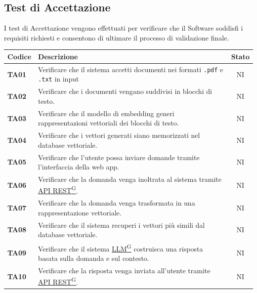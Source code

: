\documentclass{article}
\begin{document}
\newpage
\subsection{Test di Accettazione} %
I test di Accettazione vengono effettuati per verificare che il Software soddisfi i requisiti richiesti e consentono di ultimare il processo di validazione finale.

\begin{longtable}{|>{\centering\arraybackslash}m{}|>{\raggedright\arraybackslash}m{}|c|}
    \hline
    \textbf{Codice} & \textbf{Descrizione} & \textbf{Stato} \\
    \hline
    \textbf{TA01} & Verificare che il sistema accetti documenti nei formati \texttt{.pdf} e \texttt{.txt} in input & NI \\
    \hline
    \textbf{TA02} & Verificare che i documenti vengano suddivisi in blocchi di testo. & NI \\
    \hline
    \textbf{TA03} & Verificare che il modello di embedding generi rappresentazioni vettoriali dei blocchi di testo. & NI\\
    \hline
    \textbf{TA04} & Verificare che i vettori generati siano memorizzati nel database vettoriale. & NI\\
    \hline
    \textbf{TA05} & Verificare che l’utente possa inviare domande tramite l’interfaccia della web app.& NI\\
    \hline
    \textbf{TA06} & Verificare che la domanda venga inoltrata al sistema tramite \href{https://code7crusaders.github.io/docs/RTB/documentazione_interna/glossario.html#api-rest-representational-state-transfer}{API REST\textsuperscript{G}}. & NI\\
    \hline
    \textbf{TA07} & Verificare che la domanda venga trasformata in una rappresentazione vettoriale. & NI\\
    \hline
    \textbf{TA08} & Verificare che il sistema recuperi i vettori più simili dal database vettoriale. & NI\\
    \hline
    \textbf{TA09} & Verificare che il sistema \href{https://code7crusaders.github.io/docs/RTB/documentazione_interna/glossario.html#llm-large-language-model}{LLM\textsuperscript{G}} costruisca una risposta basata sulla domanda e sul contesto. & NI\\
    \hline
    \textbf{TA10} & Verificare che la risposta venga inviata all’utente tramite \href{https://code7crusaders.github.io/docs/RTB/documentazione_interna/glossario.html#api-rest-representational-state-transfer}{API REST\textsuperscript{G}}.& NI\\

\end{longtable}
\end{document}
